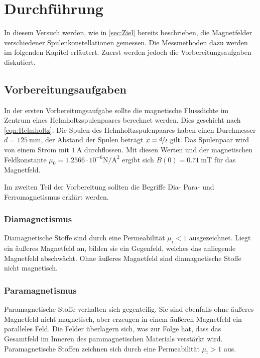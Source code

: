 \section{Durchführung}
\label{sec:Durchführung}
In diesem Versuch werden, wie in \autoref{sec:Ziel} bereits beschrieben, die Magnetfelder verschiedener Spulenkonstellationen gemessen. Die Messmethoden dazu werden im folgenden 
Kapitel erläutert. Zuerst werden jedoch die Vorbereitungsaufgaben diskutiert.
\subsection{Vorbereitungsaufgaben}
\label{subsec:VBA}
In der ersten Vorbereitungsaufgabe sollte die magnetische Flussdichte im Zentrum eines Helmholtzspulenpaares berechnet werden. Dies geschieht nach \autoref{eqn:Helmholtz}.
Die Spulen des Helmholtzspulenpaares haben einen Durchmesser $d = 125\: \unit{\milli\metre}$, der Abstand der Spulen beträgt $x = \sfrac{d}{2}$ gilt. Das Spulenpaar 
wird von einem Strom mit $1 \: \unit{\ampere}$ durchflossen. Mit diesen Werten und der magnetischen Feldkonstante 
$\mu_0 = 1.2566\cdot 10^{-6} \unit{\newton\per\ampere\squared}$\cite{scipy} ergibt sich $B(0) = 0.71\: \unit{\milli\tesla}$ für das Magnetfeld. 

Im zweiten Teil der Vorbereitung sollten die Begriffe Dia- Para- und Ferromagnetismus erklärt werden. 
\subsubsection{Diamagnetismus}
\label{subsubsec:DIA}
Diamagnetische Stoffe sind durch eine Permeabilität $\mu_{\text{r}} < 1$ ausgezeichnet. Liegt ein äußeres Magnetfeld an, bilden sie ein Gegenfeld, welches das anliegende Magnetfeld
abschwächt. Ohne äußeres Magnetfeld sind diamagnetische Stoffe nicht magnetisch. 
\subsubsection{Paramagnetismus}
\label{subsubsec:PARA}
Paramagnetische Stoffe verhalten sich gegenteilig. Sie sind ebenfalls ohne äußeres Magnetfeld nicht magnetisch, aber erzeugen in einem äußeren Magnetfeld ein paralleles Feld.
Die Felder überlagern sich, was zur Folge hat, dass das Gesamtfeld im Inneren des paramagnetischen Materials verstärkt wird. Paramagnetische Stoffen zeichnen sich durch eine 
Permeabilität $\mu_{\text{r}} > 1$ aus. 
